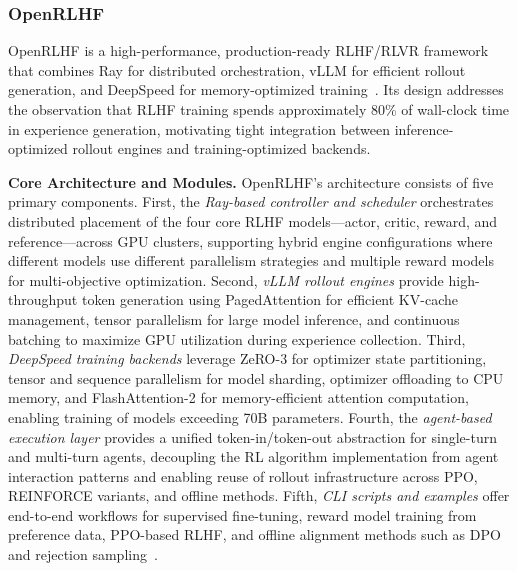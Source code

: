 \documentclass[conference]{IEEEtran}
\begin{document}
\subsubsection{OpenRLHF}

OpenRLHF is a high-performance, production-ready RLHF/RLVR framework that combines Ray for distributed orchestration, vLLM for efficient rollout generation, and DeepSpeed for memory-optimized training~\cite{openrlhf-paper, openrlhf-github}. Its design addresses the observation that RLHF training spends approximately 80\% of wall-clock time in experience generation, motivating tight integration between inference-optimized rollout engines and training-optimized backends.

\textbf{Core Architecture and Modules.} OpenRLHF's architecture consists of five primary components. First, the \textit{Ray-based controller and scheduler} orchestrates distributed placement of the four core RLHF models—actor, critic, reward, and reference—across GPU clusters, supporting hybrid engine configurations where different models use different parallelism strategies and multiple reward models for multi-objective optimization. Second, \textit{vLLM rollout engines} provide high-throughput token generation using PagedAttention for efficient KV-cache management, tensor parallelism for large model inference, and continuous batching to maximize GPU utilization during experience collection. Third, \textit{DeepSpeed training backends} leverage ZeRO-3 for optimizer state partitioning, tensor and sequence parallelism for model sharding, optimizer offloading to CPU memory, and FlashAttention-2 for memory-efficient attention computation, enabling training of models exceeding 70B parameters. Fourth, the \textit{agent-based execution layer} provides a unified token-in/token-out abstraction for single-turn and multi-turn agents, decoupling the RL algorithm implementation from agent interaction patterns and enabling reuse of rollout infrastructure across PPO, REINFORCE variants, and offline methods. Fifth, \textit{CLI scripts and examples} offer end-to-end workflows for supervised fine-tuning, reward model training from preference data, PPO-based RLHF, and offline alignment methods such as DPO and rejection sampling~\cite{openrlhf-github}.
\end{document}
